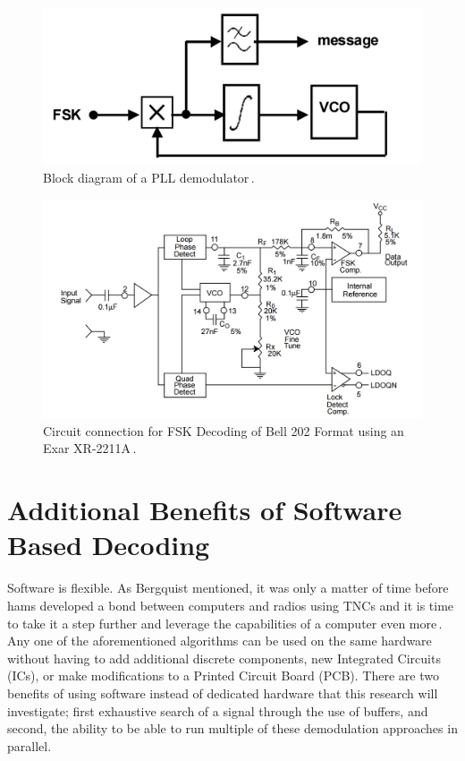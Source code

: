 \begin{figure}
  \centering
	\includegraphics[width=0.75\linewidth]{images/PLLBlockDiagram.PNG} 
	\caption{Block diagram of a PLL demodulator\,\cite{Roppel}.}
   \label{PLLBlockDiagram}
\end{figure}
\begin{figure}
  \centering
	\includegraphics[width=0.75\linewidth]{images/XR2211Circuit.PNG} 
	\caption{Circuit connection for FSK Decoding of Bell 202 Format using an Exar XR-2211A\,\cite{EXAR1997}.}
   \label{XR2211Circuit}
\end{figure}

\section{Additional Benefits of Software Based Decoding}
Software is flexible. As Bergquist mentioned, it was only a matter of time before hams developed a bond between computers and radios using TNCs and it is time to take it a step further and leverage the capabilities of a computer even more\,\cite{Bergquist2001}. Any one of the aforementioned algorithms can be used on the same hardware without having to add additional discrete components, new Integrated Circuits (ICs), or make modifications to a Printed Circuit Board (PCB). There are two benefits of using software instead of dedicated hardware that this research will investigate; first exhaustive search of a signal through the use of buffers, and second, the ability to be able to run multiple of these demodulation approaches in parallel.

